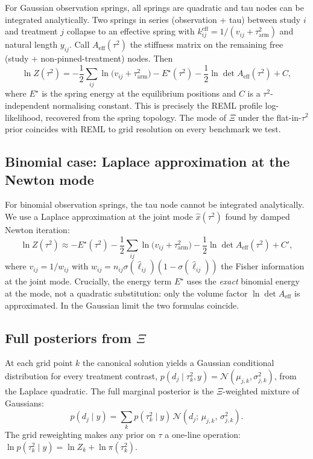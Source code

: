 \documentclass[12pt]{article}
\begin{document}
For Gaussian observation springs, all springs are quadratic and
tau nodes can be integrated analytically. Two springs in series
(observation + tau) between study $i$ and treatment $j$ collapse to
an effective spring with
$k^{\text{eff}}_{ij} = 1/(v_{ij} + \tau^2_{\text{arm}})$ and natural
length $y_{ij}$. Call $A_{\text{eff}}(\tau^2)$ the stiffness matrix on
the remaining free (study + non-pinned-treatment) nodes. Then
\begin{equation}
\ln Z(\tau^2) = -\frac{1}{2}
\sum_{ij} \ln\!\bigl(v_{ij} + \tau^2_{\text{arm}}\bigr)
- E^{\star}(\tau^2)
- \frac{1}{2} \ln \det A_{\text{eff}}(\tau^2)
+ C,
\end{equation}
where $E^{\star}$ is the spring energy at the equilibrium
positions and $C$ is a $\tau^2$-independent normalising constant.
This is precisely the REML profile log-likelihood, recovered from
the spring topology. The mode of $\Xi$ under the flat-in-$\tau^2$
prior coincides with REML to grid resolution on every benchmark
we test.

\subsection{Binomial case: Laplace approximation at the Newton mode}

For binomial observation springs, the tau node cannot be
integrated analytically. We use a Laplace approximation at the
joint mode $\hat{x}(\tau^2)$ found by damped Newton iteration:
\begin{equation}
\ln Z(\tau^2) \approx
- E^{\star}(\tau^2)
- \frac{1}{2} \sum_{ij} \ln\!\bigl(v_{ij} + \tau^2_{\text{arm}}\bigr)
- \frac{1}{2} \ln \det A_{\text{eff}}(\tau^2)
+ C',
\end{equation}
where $v_{ij} = 1 / w_{ij}$ with
$w_{ij} = n_{ij} \sigma(\hat{\ell}_{ij}) (1 - \sigma(\hat{\ell}_{ij}))$
the Fisher information at the joint mode. Crucially, the energy term
$E^{\star}$ uses the \emph{exact} binomial energy at the mode, not a
quadratic substitution: only the volume factor $\ln \det A_{\text{eff}}$
is approximated. In the Gaussian limit the two formulas coincide.

\subsection{Full posteriors from $\Xi$}

At each grid point $k$ the canonical solution yields a Gaussian
conditional distribution for every treatment contrast,
$p(d_j \mid \tau^2_k, y) = \mathcal{N}(\mu_{j,k}, \sigma^2_{j,k})$,
from the Laplace quadratic. The full marginal posterior is the
$\Xi$-weighted mixture of Gaussians:
\begin{equation}
\label{eq:mixture}
p(d_j \mid y)
= \sum_{k} p(\tau^2_k \mid y) \,
\mathcal{N}(d_j;\, \mu_{j,k},\, \sigma^2_{j,k}).
\end{equation}
The grid reweighting makes any prior on $\tau$ a one-line operation:
$\ln p(\tau^2_k \mid y) = \ln Z_k + \ln \pi(\tau^2_k)$.
\end{document}
